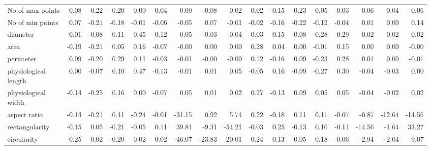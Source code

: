 \documentclass{article}
\begin{document}
\begin{table}[!ht]
{\begin{tabular}{lrrrrrrrrrrrrrrrr}
No of max points                                                            & 0.08  & -0.22 & -0.20 & 0.00 & -0.04 & 0.00   & -0.08    & -0.02     & -0.02 & -0.15 & -0.23 & 0.05 & -0.03 & 0.06     & 0.04     & -0.06     \\
No of min points                                                            & 0.07  & -0.21 & -0.18 & -0.01 & -0.06 & -0.05    & 0.07     & -0.01     & -0.02 & -0.16 & -0.22 & -0.12 & -0.04 & 0.01    & 0.00    & 0.14       \\
diameter                                                                    & 0.01  & -0.08 & 0.11  & 0.45  & -0.12 & 0.05     & -0.03    & -0.04     & -0.03 & 0.15  & -0.08 & -0.28 & 0.29  & 0.02     & 0.02     & 0.02      \\
area                                                                        & -0.19 & -0.21 & 0.05  & 0.16  & -0.07 & -0.00 & 0.00 & 0.00  & 0.28  & 0.04  & 0.00  & -0.01 & 0.15 & 0.00 & 0.00 & -0.00 \\
perimeter                                                                   & 0.09  & -0.20 & 0.29  & 0.11  & -0.03 & -0.01    & -0.00   & -0.00 & 0.12  & -0.16 & 0.09  & -0.23 & 0.28  & 0.01    & 0.00    & -0.01    \\
physiological length                                                        & 0.00  & -0.07 & 0.10  & 0.47  & -0.13 & -0.01    & 0.01    & 0.05      & -0.05 & 0.16  & -0.09 & -0.27 & 0.30  & -0.04    & -0.03    & 0.00    \\
physiological width                                                         & -0.14 & -0.25 & 0.16  & 0.00 & -0.07 & 0.05     & 0.01     & 0.02      & 0.27  & -0.13 & 0.09  & 0.05  & 0.05  & -0.04    & -0.02    & 0.02      \\
aspect ratio                                                                & -0.14 & -0.21 & 0.11  & -0.24 & -0.01 & -31.15     & 0.92      & 5.74        & 0.22  & -0.18 & 0.11  & 0.11  & -0.07 & -0.87     & -12.64      & -14.56       \\
rectangularity                                                              & -0.15 & 0.05  & -0.21 & -0.05 & 0.11  & 39.81       & -9.31      & -54.21       & -0.03 & 0.25  & -0.13 & 0.10  & -0.11 & -14.56      & -1.64      & 33.27        \\
circularity                                                                 & -0.25 & 0.02  & -0.20 & 0.02  & -0.02 & -46.07      & -23.83      & 20.01        & 0.24  & 0.13  & -0.05 & 0.18  & -0.06 & -2.94      & -2.04      & 9.07        \\

\end{tabular}}
\end{table}
\end{document}
